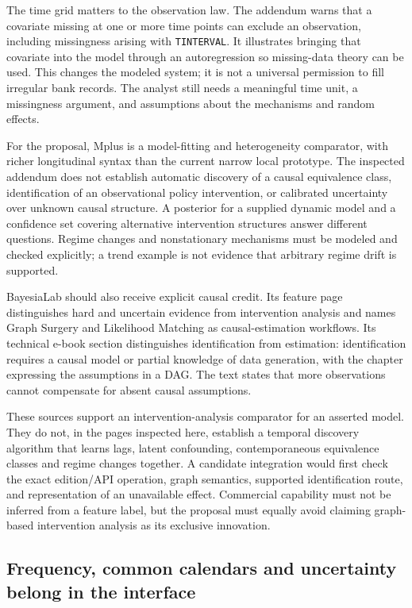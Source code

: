 The time grid matters to the observation law. The addendum warns that a
covariate missing at one or more time points can exclude an observation,
including missingness arising with \texttt{TINTERVAL}. It illustrates
bringing that covariate into the model through an autoregression so
missing-data theory can be used. This changes the modeled system; it is
not a universal permission to fill irregular bank records. The analyst
still needs a meaningful time unit, a missingness argument, and
assumptions about the mechanisms and random effects.

For the proposal, Mplus is a model-fitting and heterogeneity comparator,
with richer longitudinal syntax than the current narrow local prototype.
The inspected addendum does not establish automatic discovery of a
causal equivalence class, identification of an observational policy
intervention, or calibrated uncertainty over unknown causal structure. A
posterior for a supplied dynamic model and a confidence set covering
alternative intervention structures answer different questions. Regime
changes and nonstationary mechanisms must be modeled and checked
explicitly; a trend example is not evidence that arbitrary regime drift
is supported.

BayesiaLab should also receive explicit causal credit. Its feature page
distinguishes hard and uncertain evidence from intervention analysis and
names Graph Surgery and Likelihood Matching as causal-estimation
workflows. Its technical e-book section distinguishes identification
from estimation: identification requires a causal model or partial
knowledge of data generation, with the chapter expressing the
assumptions in a DAG. The text states that more observations cannot
compensate for absent causal
assumptions.~\citep{exec13_ct_bayesia_inference,exec13_ct_bayesia_identification}

These sources support an intervention-analysis comparator for an
asserted model. They do not, in the pages inspected here, establish a
temporal discovery algorithm that learns lags, latent confounding,
contemporaneous equivalence classes and regime changes together. A
candidate integration would first check the exact edition/API operation,
graph semantics, supported identification route, and representation of
an unavailable effect. Commercial capability must not be inferred from a
feature label, but the proposal must equally avoid claiming graph-based
intervention analysis as its exclusive innovation.

\hypertarget{frequency-common-calendars-and-uncertainty-belong-in-the-interface}{%
\subsection{Frequency, common calendars and uncertainty belong in the
interface}\label{frequency-common-calendars-and-uncertainty-belong-in-the-interface}}

